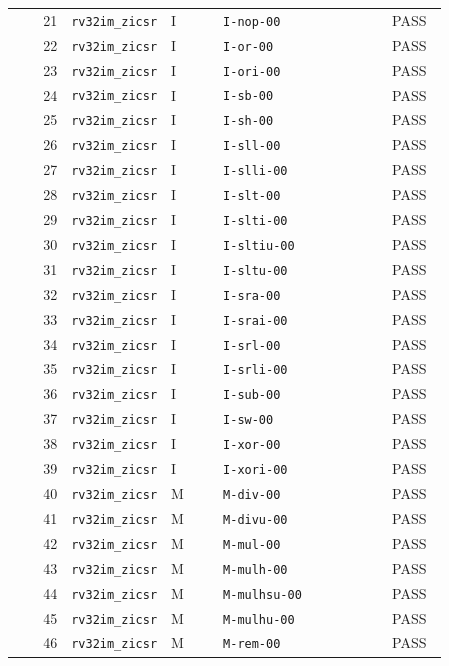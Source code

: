\begin{reporttable}
\begin{longtable}{@{}r p{0.22\linewidth}p{0.12\linewidth}p{0.39\linewidth}p{0.13\linewidth}@{}}
21 & \texttt{rv32im\_zicsr} & I & \texttt{I-nop-00} & PASS \\
22 & \texttt{rv32im\_zicsr} & I & \texttt{I-or-00} & PASS \\
23 & \texttt{rv32im\_zicsr} & I & \texttt{I-ori-00} & PASS \\
24 & \texttt{rv32im\_zicsr} & I & \texttt{I-sb-00} & PASS \\
25 & \texttt{rv32im\_zicsr} & I & \texttt{I-sh-00} & PASS \\
26 & \texttt{rv32im\_zicsr} & I & \texttt{I-sll-00} & PASS \\
27 & \texttt{rv32im\_zicsr} & I & \texttt{I-slli-00} & PASS \\
28 & \texttt{rv32im\_zicsr} & I & \texttt{I-slt-00} & PASS \\
29 & \texttt{rv32im\_zicsr} & I & \texttt{I-slti-00} & PASS \\
30 & \texttt{rv32im\_zicsr} & I & \texttt{I-sltiu-00} & PASS \\
31 & \texttt{rv32im\_zicsr} & I & \texttt{I-sltu-00} & PASS \\
32 & \texttt{rv32im\_zicsr} & I & \texttt{I-sra-00} & PASS \\
33 & \texttt{rv32im\_zicsr} & I & \texttt{I-srai-00} & PASS \\
34 & \texttt{rv32im\_zicsr} & I & \texttt{I-srl-00} & PASS \\
35 & \texttt{rv32im\_zicsr} & I & \texttt{I-srli-00} & PASS \\
36 & \texttt{rv32im\_zicsr} & I & \texttt{I-sub-00} & PASS \\
37 & \texttt{rv32im\_zicsr} & I & \texttt{I-sw-00} & PASS \\
38 & \texttt{rv32im\_zicsr} & I & \texttt{I-xor-00} & PASS \\
39 & \texttt{rv32im\_zicsr} & I & \texttt{I-xori-00} & PASS \\
40 & \texttt{rv32im\_zicsr} & M & \texttt{M-div-00} & PASS \\
41 & \texttt{rv32im\_zicsr} & M & \texttt{M-divu-00} & PASS \\
42 & \texttt{rv32im\_zicsr} & M & \texttt{M-mul-00} & PASS \\
43 & \texttt{rv32im\_zicsr} & M & \texttt{M-mulh-00} & PASS \\
44 & \texttt{rv32im\_zicsr} & M & \texttt{M-mulhsu-00} & PASS \\
45 & \texttt{rv32im\_zicsr} & M & \texttt{M-mulhu-00} & PASS \\
46 & \texttt{rv32im\_zicsr} & M & \texttt{M-rem-00} & PASS \\

\end{longtable}
\end{reporttable}
